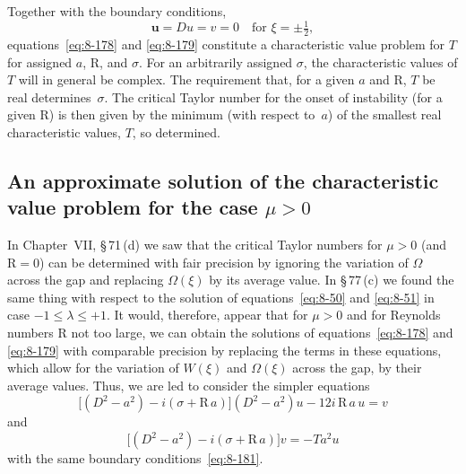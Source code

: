 Together with the boundary conditions,
\begin{equation}
\label{eq:8-181}
\mathbf{u} = Du = v = 0 \quad \text{for } \xi = \pm\tfrac{1}{2},
\end{equation}
equations~\eqref{eq:8-178} and \eqref{eq:8-179} constitute a characteristic value problem for $T$ for assigned $a$, $\mathrm{R}$, and $\sigma$. For an arbitrarily assigned $\sigma$, the characteristic values of $T$ will in general be complex. The requirement that, for a given $a$ and R, $T$ be real determines~$\sigma$. The critical Taylor number for the onset of instability (for a given R) is then given by the minimum (with respect to~$a$) of the smallest real characteristic values, $T$, so determined.

\subsection{An approximate solution of the characteristic value problem for the case $\mu > 0$}
\label{sec:79c}

In Chapter~VII, \S\,71\,(d) we saw that the critical Taylor numbers for $\mu > 0$ (and $\mathrm{R} = 0$) can be determined with fair precision by ignoring the variation of $\Omega$ across the gap and replacing $\Omega(\xi)$ by its average value. In \S\,77\,(c) we found the same thing with respect to the solution of equations~\eqref{eq:8-50} and \eqref{eq:8-51} in case $-1 \leqslant \lambda \leqslant +1$. It would, therefore, appear that for $\mu > 0$ and for Reynolds numbers R not too large, we can obtain the solutions of equations~\eqref{eq:8-178} and \eqref{eq:8-179} with comparable precision by replacing the terms in these equations, which allow for the variation of $W(\xi)$ and $\Omega(\xi)$ across the gap, by their average values. Thus, we are led to consider the simpler equations
\begin{equation}
\label{eq:8-182}
\bigl[(D^2-a^2) - i(\sigma + \mathrm{R}\,a)\bigr](D^2 - a^2)u - 12i\,\mathrm{R}\,a\,u = v
\end{equation}
and
\begin{equation}
\label{eq:8-183}
\bigl[(D^2-a^2) - i(\sigma + \mathrm{R}\,a)\bigr]v = -Ta^2 u
\end{equation}
with the same boundary conditions~\eqref{eq:8-181}.

